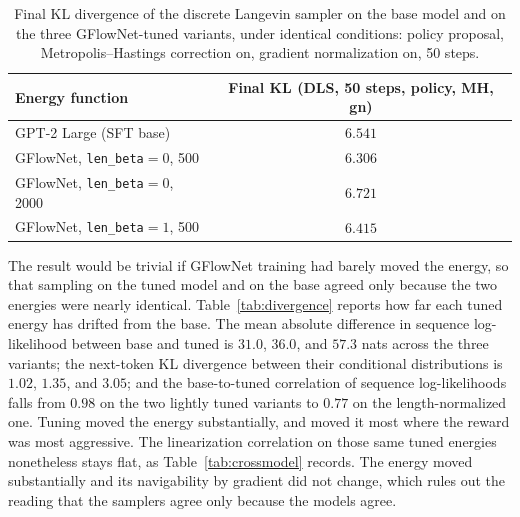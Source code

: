 \begin{table}[t]
    \centering
    \small
    \begin{tabular}{lc}
        \toprule
        Energy function & Final KL (DLS, 50 steps, policy, MH, gn) \\
        \midrule
        GPT-2 Large (SFT base) & $6.541$ \\
        GFlowNet, \texttt{len\_beta}$=0$, 500 & $6.306$ \\
        GFlowNet, \texttt{len\_beta}$=0$, 2000 & $6.721$ \\
        GFlowNet, \texttt{len\_beta}$=1$, 500 & $6.415$ \\
        \bottomrule
    \end{tabular}
    \caption[Final KL on the base model and the three GFlowNet variants.]{Final KL divergence of the discrete Langevin sampler on the base model and on the three GFlowNet-tuned variants, under identical conditions: policy proposal, Metropolis--Hastings correction on, gradient normalization on, 50 steps.}
    \label{tab:gfn-unify}
\end{table}

The result would be trivial if GFlowNet training had barely moved the energy, so that sampling on the tuned model and on the base agreed only because the two energies were nearly identical. Table~\ref{tab:divergence} reports how far each tuned energy has drifted from the base. The mean absolute difference in sequence log-likelihood between base and tuned is $31.0$, $36.0$, and $57.3$ nats across the three variants; the next-token KL divergence between their conditional distributions is $1.02$, $1.35$, and $3.05$; and the base-to-tuned correlation of sequence log-likelihoods falls from $0.98$ on the two lightly tuned variants to $0.77$ on the length-normalized one. Tuning moved the energy substantially, and moved it most where the reward was most aggressive.
The linearization correlation on those same tuned energies nonetheless stays flat, as Table~\ref{tab:crossmodel} records. The energy moved substantially and its navigability by gradient did not change, which rules out the reading that the samplers agree only because the models agree.

